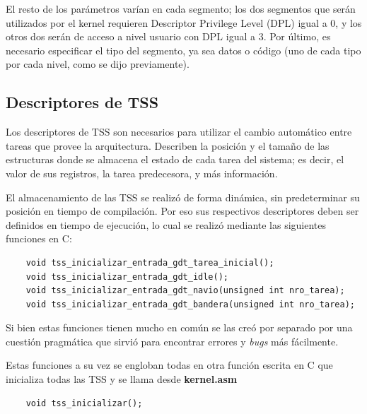 	El resto de los parámetros varían en cada segmento; los dos segmentos que serán utilizados por el 
kernel requieren Descriptor Privilege Level (DPL) igual a 0, y los otros dos serán de acceso a nivel usuario con DPL igual a 3. Por último, es necesario especificar el tipo del segmento, ya sea datos o código (uno de cada tipo por cada nivel, como se dijo previamente).

\subsection{Descriptores de TSS}

	Los descriptores de TSS son necesarios para utilizar el cambio automático entre tareas 
que provee la arquitectura. Describen la posición y el tamaño de las estructuras donde se almacena 
el estado de cada tarea del sistema; es decir, el valor de sus registros, la tarea predecesora, y más información.

	El almacenamiento de las TSS se realizó de forma dinámica, sin predeterminar su posición en 
tiempo de compilación. Por eso sus respectivos descriptores deben ser definidos en tiempo de 
ejecución, lo cual se realizó mediante las siguientes funciones en C:

\begin{verbatim}
	void tss_inicializar_entrada_gdt_tarea_inicial();
	void tss_inicializar_entrada_gdt_idle();
	void tss_inicializar_entrada_gdt_navio(unsigned int nro_tarea);
	void tss_inicializar_entrada_gdt_bandera(unsigned int nro_tarea);
\end{verbatim}

	Si bien estas funciones tienen mucho en común se las creó por separado
por una cuestión pragmática que sirvió para encontrar errores y \textit{bugs} más
fácilmente.

	Estas funciones a su vez se engloban todas en otra función escrita en C que
inicializa todas las TSS y se llama desde \textbf{kernel.asm}

\begin{verbatim}
	void tss_inicializar();
\end{verbatim}

